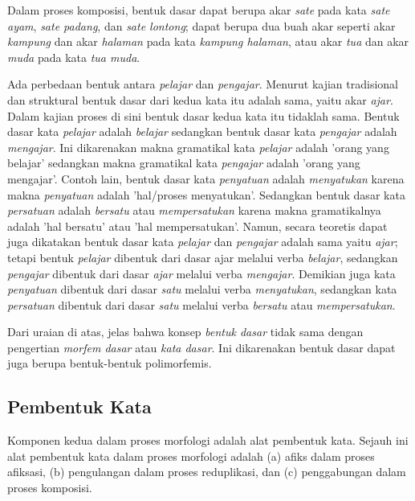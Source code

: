 Dalam proses komposisi, bentuk dasar dapat berupa akar \textit{sate} pada kata \textit{sate ayam}, \textit{sate padang}, dan \textit{sate lontong}; dapat berupa dua buah akar seperti akar \textit{kampung} dan akar \textit{halaman} pada kata \textit{kampung halaman}, atau akar \textit{tua} dan akar \textit{muda} pada kata \textit{tua muda}.

Ada perbedaan bentuk antara \textit{pelajar} dan \textit{pengajar}. Menurut kajian tradisional dan struktural bentuk dasar dari kedua kata itu adalah sama, yaitu akar \textit{ajar}. Dalam kajian proses di sini bentuk dasar kedua kata itu tidaklah sama. Bentuk dasar kata \textit{pelajar} adalah \textit{belajar} sedangkan bentuk dasar kata \textit{pengajar} adalah \textit{mengajar}. Ini dikarenakan makna gramatikal kata \textit{pelajar} adalah 'orang yang belajar' sedangkan makna gramatikal kata \textit{pengajar} adalah 'orang yang mengajar'. Contoh lain, bentuk dasar kata \textit{penyatuan} adalah \textit{menyatukan} karena makna \textit{penyatuan} adalah 'hal/proses menyatukan'. Sedangkan bentuk dasar kata \textit{persatuan} adalah \textit{bersatu} atau \textit{mempersatukan} karena makna gramatikalnya adalah 'hal bersatu' atau 'hal mempersatukan'. Namun, secara teoretis dapat juga dikatakan bentuk dasar kata \textit{pelajar} dan \textit{pengajar} adalah sama yaitu \textit{ajar}; tetapi bentuk \textit{pelajar} dibentuk dari dasar ajar melalui verba \textit{belajar}, sedangkan \textit{pengajar} dibentuk dari dasar \textit{ajar} melalui verba \textit{mengajar}. Demikian juga kata \textit{penyatuan} dibentuk dari dasar \textit{satu} melalui verba \textit{menyatukan}, sedangkan kata \textit{persatuan} dibentuk dari dasar \textit{satu} melalui verba \textit{bersatu} atau \textit{mempersatukan}.

Dari uraian di atas, jelas bahwa konsep \textit{bentuk dasar} tidak sama dengan pengertian \textit{morfem dasar} atau \textit{kata dasar}. Ini dikarenakan bentuk dasar dapat juga berupa bentuk-bentuk polimorfemis.


\subsection{Pembentuk Kata}
\label{sec:pembentukKata}

Komponen kedua dalam proses morfologi adalah alat pembentuk kata. Sejauh ini alat pembentuk kata dalam proses morfologi adalah (a) afiks dalam proses afiksasi, (b) pengulangan dalam proses reduplikasi, dan (c) penggabungan dalam proses komposisi.

